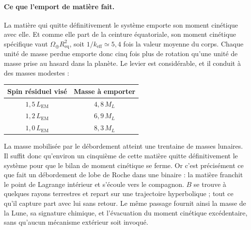 \documentclass[11pt,a4paper,openany]{report}
\newcommand{\Req}{R_{\mathrm{eq}}}
\begin{document}
\paragraph{Ce que l'emport de matière fait.} La matière qui quitte définitivement le système
emporte son moment cinétique avec elle. Et comme elle part de la ceinture équatoriale, son moment
cinétique spécifique vaut $\Omega_\oplus\Req^{2}$, soit $1/k_{\mathrm{eff}}\simeq5{,}4$ fois la
valeur moyenne du corps. Chaque unité de masse perdue emporte donc cinq fois plus de rotation
qu'une unité de masse prise au hasard dans la planète. Le levier est considérable, et il conduit à
des masses modestes :

\begin{center}
\begin{tabular}{cc}
\toprule
\textbf{Spin résiduel visé} & \textbf{Masse à emporter} \\
\midrule
$1{,}5\,L_{\mathrm{EM}}$ & $4{,}8\,M_L$ \\
$1{,}2\,L_{\mathrm{EM}}$ & $6{,}9\,M_L$ \\
$1{,}0\,L_{\mathrm{EM}}$ & $8{,}3\,M_L$ \\
\bottomrule
\end{tabular}
\end{center}

\begin{ideephys}
La masse mobilisée par le débordement atteint une trentaine de masses lunaires. Il suffit donc
qu'environ un cinquième de cette matière quitte définitivement le système pour que le bilan de
moment cinétique se ferme. Or c'est précisément ce que fait un débordement de lobe de Roche dans
une binaire : la matière franchit le point de Lagrange intérieur et s'écoule vers le compagnon. $B$
se trouve à quelques rayons terrestres et repart sur une trajectoire hyperbolique ; tout ce qu'il
capture part avec lui sans retour. Le même passage fournit ainsi la masse de la Lune, sa signature
chimique, et l'évacuation du moment cinétique excédentaire, sans qu'aucun mécanisme extérieur soit
invoqué.
\end{ideephys}
\end{document}
